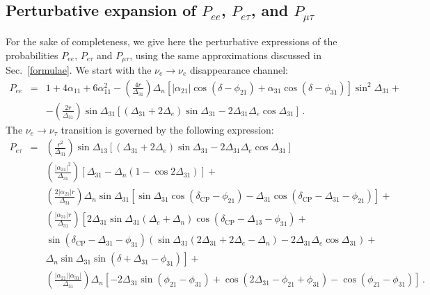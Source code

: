 \documentclass[11pt,a4paper]{article}
\newcommand{\nue}{\mbox{$\nu_e$}}
\begin{document}
\begin{appendix}
\subsection*{Perturbative expansion of $P_{ee}$, $P_{e\tau}$, and $P_{\mu\tau}$}
For the sake of completeness,  we give here the perturbative expressions of  the probabilities $P_{ee}$, $P_{e\tau}$ and $P_{\mu\tau}$, using the same approximations discussed in Sec.~\ref{formulae}. We start with the $\nu_e\rightarrow\nu_e$ disappearance channel: 
\begin{eqnarray}
P_{e e } &=& 1 + 4 \alpha_{11} +6 \alpha_{11}^2-\left(\frac{4 r }{\Delta_{31}}\right)\Delta_n \left[|\alpha_{21}| \cos(\delta-\phi_{21})+ \alpha_{31} \cos(\delta-\phi_{31})\right]\sin^2\Delta_{31} +\nonumber \\
&& -\left(\frac{2 r }{\Delta_{31}}\right) \sin\Delta_{31}\left[(\Delta_{31}+2\Delta_e)\sin\Delta_{31}-2\Delta_{31}\Delta_e \cos\Delta_{31}\right] \,.
\label{eq:e-disapp}
\end{eqnarray}
The $\nue\rightarrow\nu_\tau$ transition is governed by the following expression: 
\begin{eqnarray}
P_{e \tau} &=&  \left(\frac{r^2}{\Delta_{31}}\right) \sin \Delta_{13} \left[(\Delta_{31}+2 \Delta_e) \sin \Delta_{31}-2 \Delta_{31} \Delta_e \cos\Delta_{31}\right]\nonumber \\
&& \left(\frac{|\alpha_{31}|^2}{\Delta_{31}}\right)\left[\Delta_{31}-\Delta_n (1-\cos2\Delta_{31})\right]+
\nonumber \\
&& \left(\frac{2 |\alpha_{21}|  r }{\Delta_{31}}\right)\Delta_n\sin\Delta_{31} \left[\sin\Delta_{31} \cos (\delta_{\mathrm{CP}}-\phi_{21})-\Delta_{31} \cos
   (\delta_{\mathrm{CP}}-\Delta_{31}-\phi_{21})\right]+
 \\
&&\left(\frac{|\alpha_{31}| r }{\Delta_{31}}\right)\left[2 \Delta_{31} \sin\Delta_{31} (\Delta_e+\Delta_n) \cos (\delta_{\mathrm{CP}}-\Delta_{13}-\phi_{31})+\right. \nonumber \\
&&\left.\sin (\delta_{\mathrm{CP}}-\Delta_{31}-\phi_{31}) (\sin\Delta_{31} (2 \Delta_{31}+2\Delta_e-\Delta_n)-2 \Delta_{31} \Delta_e \cos \Delta_{31})+\right. \nonumber \\ && \nonumber \left. \Delta_n \sin\Delta_{31} \sin (\delta
+\Delta_{31}-\phi_{31})\right]+\nonumber\\
&&
\left(\frac{|\alpha_{21}| |\alpha_{31}|}{\Delta_{31}}\right) \Delta_n \left[-2 \Delta_{31} \sin (\phi_{21}-\phi_{31})+\cos (2 \Delta_{31}-\phi_{21}+\phi_{31})-\cos (\phi_{21}-\phi_{31})\right]\,.\nonumber
\end{eqnarray}

\end{appendix}
\end{document}
